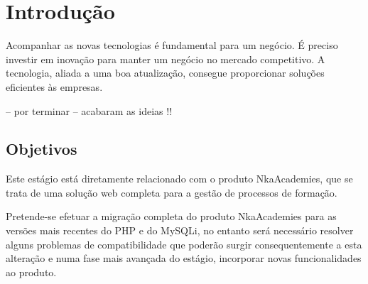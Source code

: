 
\chapter{Introdução}


Acompanhar as novas tecnologias é fundamental para um negócio. É preciso investir em inovação para manter um negócio no mercado competitivo. A tecnologia, aliada a uma boa atualização, consegue proporcionar soluções eficientes às empresas.

-- por terminar -- acabaram as ideias !!

\section{ Objetivos }


Este estágio está diretamente relacionado com o produto NkaAcademies, que se trata de uma solução web completa para a gestão de processos de formação.


Pretende-se efetuar a migração completa do produto NkaAcademies para as versões mais recentes do PHP e do MySQLi, no entanto será necessário resolver alguns problemas de compatibilidade que poderão surgir consequentemente a esta alteração e numa fase mais avançada do estágio, incorporar novas funcionalidades ao produto.


